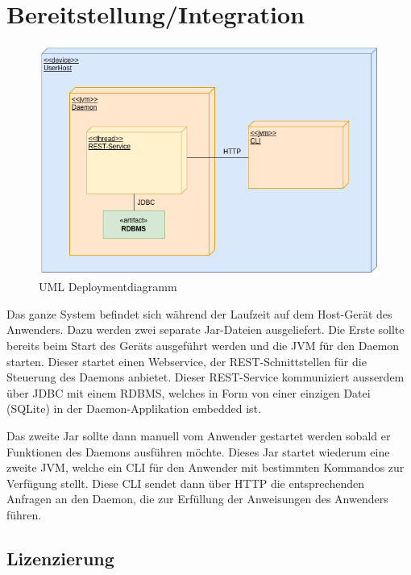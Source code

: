 \documentclass[a4paper,12pt]{report}
\begin{document}
    \chapter{Bereitstellung/Integration}

    \begin{figure}[h]
        \centering
        \includegraphics[width=1\textwidth]{assets/DeplDiagram}
        \caption{UML Deploymentdiagramm}
        \label{fig:depl-diag}
    \end{figure}

    Das ganze System befindet sich während der Laufzeit auf dem Host-Gerät des Anwenders.
    Dazu werden zwei separate Jar-Dateien ausgeliefert.
    Die Erste sollte bereits beim Start des Geräts ausgeführt werden und die JVM für den Daemon starten.
    Dieser startet einen Webservice, der REST-Schnittstellen für die Steuerung des Daemons anbietet.
    Dieser REST-Service kommuniziert ausserdem über JDBC mit einem RDBMS, welches in Form von einer einzigen Datei (SQLite)
    in der Daemon-Applikation embedded ist.

    Das zweite Jar sollte dann manuell vom Anwender gestartet werden sobald er Funktionen des Daemons ausführen möchte.
    Dieses Jar startet wiederum eine zweite JVM, welche ein CLI für den Anwender mit bestimmten Kommandos zur Verfügung stellt.
    Diese CLI sendet dann über HTTP die entsprechenden Anfragen an den Daemon, die zur Erfüllung der Anweisungen des Anwenders führen.


    \section{Lizenzierung}
\end{document}
